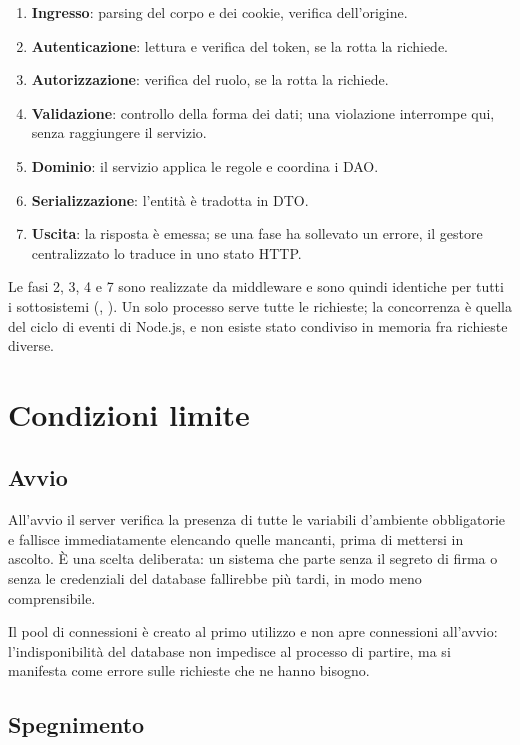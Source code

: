 \begin{enumerate}
  \item \textbf{Ingresso}: parsing del corpo e dei cookie, verifica
        dell'origine.
  \item \textbf{Autenticazione}: lettura e verifica del token, se la rotta la
        richiede.
  \item \textbf{Autorizzazione}: verifica del ruolo, se la rotta la richiede.
  \item \textbf{Validazione}: controllo della forma dei dati; una violazione
        interrompe qui, senza raggiungere il servizio.
  \item \textbf{Dominio}: il servizio applica le regole e coordina i DAO.
  \item \textbf{Serializzazione}: l'entità è tradotta in DTO.
  \item \textbf{Uscita}: la risposta è emessa; se una fase ha sollevato un
        errore, il gestore centralizzato lo traduce in uno stato HTTP.
\end{enumerate}

Le fasi 2, 3, 4 e 7 sono realizzate da middleware e sono quindi identiche per
tutti i sottosistemi (, ). Un solo processo serve tutte
le richieste; la concorrenza è quella del ciclo di eventi di Node.js, e non
esiste stato condiviso in memoria fra richieste diverse.

\section{Condizioni limite}
\label{sec:sdd-condizioni-limite}

\subsection{Avvio}

All'avvio il server verifica la presenza di tutte le variabili d'ambiente
obbligatorie e fallisce immediatamente elencando quelle mancanti, prima di
mettersi in ascolto. È una scelta deliberata: un sistema che parte senza il
segreto di firma o senza le credenziali del database fallirebbe più tardi, in
modo meno comprensibile.

Il pool di connessioni è creato al primo utilizzo e non apre connessioni
all'avvio: l'indisponibilità del database non impedisce al processo di
partire, ma si manifesta come errore sulle richieste che ne hanno bisogno.

\subsection{Spegnimento}

